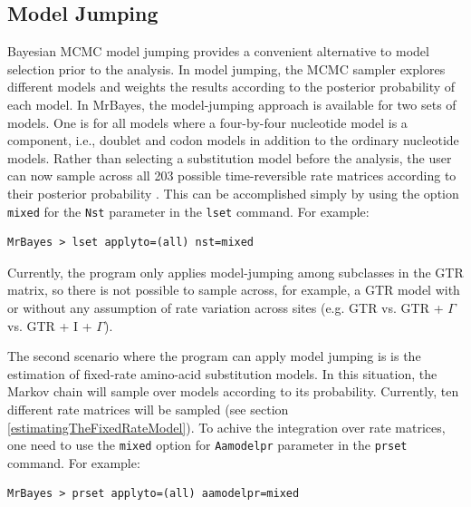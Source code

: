 \documentclass[12pt]{book}
\newcommand{\ttt}[1]{\texttt{#1}}
\begin{document}
\subsection{Model Jumping}
\label{modelJumping}

Bayesian MCMC model jumping provides a convenient alternative to model selection prior to the
analysis. In model jumping, the MCMC sampler explores different models and weights the results
according to the posterior probability of each model. In MrBayes, the model-jumping approach is
available for two sets of models. One is for all models where a four-by-four nucleotide model is a
component, i.e., doublet and codon models in addition to the ordinary nucleotide models. Rather
than selecting a substitution model before the analysis, the user can now sample across all 203
possible time-reversible rate matrices according to their posterior probability
\citep{huelsenbeck04d}. This can be accomplished simply by using the option \ttt{mixed} for the
\ttt{Nst} parameter in the \ttt{lset} command. For example:

\small
\begin{singlespacing}
\begin{verbatim}
MrBayes > lset applyto=(all) nst=mixed
\end{verbatim}
\end{singlespacing}
\normalsize

Currently, the program only applies model-jumping among subclasses in the GTR matrix, so there
is not possible to sample across, for example, a GTR model with or without any assumption of rate
variation across sites (e.g. GTR vs. GTR + $\Gamma$ vs. GTR + I + $\Gamma$).

The second scenario where the program can apply model jumping is is the estimation of fixed-rate
amino-acid substitution models. In this situation, the Markov chain will sample over models
according to its probability. Currently, ten different rate matrices will be sampled (see section
\ref{estimatingTheFixedRateModel}). To achive the integration over rate matrices, one need to use
the \ttt{mixed} option for \ttt{Aamodelpr} parameter in the \ttt{prset} command. For example:

\small
\begin{singlespacing}
\begin{verbatim}
MrBayes > prset applyto=(all) aamodelpr=mixed
\end{verbatim}
\end{singlespacing}
\normalsize
\end{document}
